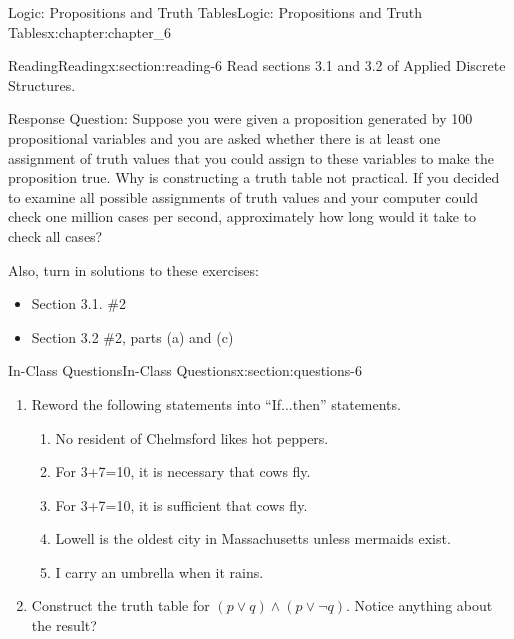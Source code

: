 \documentclass[oneside,10pt,]{book}
\numberwithin{equation}{section}
\begin{document}
\begin{chapterptx}{Logic: Propositions and Truth Tables}{}{Logic: Propositions and Truth Tables}{}{}{x:chapter:chapter_6}
%
%
%
\typeout{************************************************}
\typeout{************************************************}
%
\begin{sectionptx}{Reading}{}{Reading}{}{}{x:section:reading-6}
Read sections 3.1 and 3.2 of Applied Discrete Structures.%
\par
Response Question: Suppose you were given a proposition generated by 100 propositional variables and you are asked whether there is at least one assignment of truth values that you could assign to these variables to make the proposition true. Why is constructing a truth table not practical.  If you decided to examine all possible assignments of truth values and your computer could check one million cases per second, approximately how long would it take to check all cases?%
\par
Also, turn in solutions to these exercises:%
\begin{itemize}[label=\textbullet]
\item{}Section 3.1. \#2%
\item{}Section 3.2 \#2, parts (a) and (c)%
\end{itemize}
%
\end{sectionptx}
%
%
\typeout{************************************************}
\typeout{************************************************}
%
\begin{sectionptx}{In-Class Questions}{}{In-Class Questions}{}{}{x:section:questions-6}
%
\begin{enumerate}[label=\arabic*.]
\item{}Reword the following statements into ``If...then'' statements.%
\begin{enumerate}[label=(\alph*)]
\item{}No resident of Chelmsford likes hot peppers.%
\item{}For 3+7=10, it is necessary that cows fly.%
\item{}For 3+7=10, it is sufficient that cows fly.%
\item{}Lowell is the oldest city in Massachusetts unless mermaids exist.%
\item{}I carry an umbrella when it rains.%
\end{enumerate}
%
\item{}Construct the truth table for \((p \lor q) \land (p\lor \neg q)\).   Notice anything about the result?%

\end{enumerate}
\end{sectionptx}
\end{chapterptx}
\end{document}
